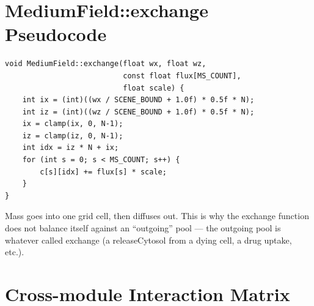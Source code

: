 \documentclass[11pt,letterpaper,twoside,openany]{book}
\begin{document}
\chapter{MediumField::exchange Pseudocode}
\label{ch:medium-exchange-pseudo}

\begin{lstlisting}[language={[ISO]C++}]
void MediumField::exchange(float wx, float wz,
                           const float flux[MS_COUNT],
                           float scale) {
    int ix = (int)((wx / SCENE_BOUND + 1.0f) * 0.5f * N);
    int iz = (int)((wz / SCENE_BOUND + 1.0f) * 0.5f * N);
    ix = clamp(ix, 0, N-1);
    iz = clamp(iz, 0, N-1);
    int idx = iz * N + ix;
    for (int s = 0; s < MS_COUNT; s++) {
        c[s][idx] += flux[s] * scale;
    }
}
\end{lstlisting}

Mass goes into one grid cell, then diffuses out. This is why the
exchange function does not balance itself against an ``outgoing''
pool --- the outgoing pool is whatever called exchange (a
releaseCytosol from a dying cell, a drug uptake, etc.).

\chapter{Cross-module Interaction Matrix}
\label{ch:interactions}
\end{document}
